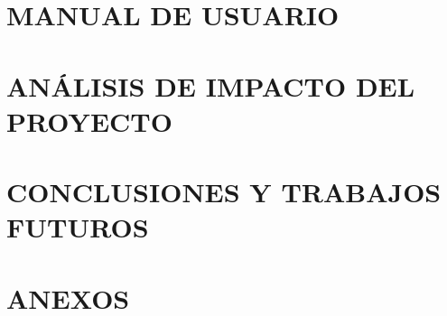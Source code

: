 \documentclass[a4paper,10pt,twoside]{article}
\begin{document}
\clearpage
\section{MANUAL DE USUARIO}



\clearpage
\section{ANÁLISIS DE IMPACTO DEL PROYECTO}


\clearpage
\section{CONCLUSIONES Y TRABAJOS FUTUROS}


\clearpage

\nocite{*} %
\printbibliography[title={Bibliografia}, heading=bibnumbered]

\clearpage

\section{ANEXOS}

\end{document}
